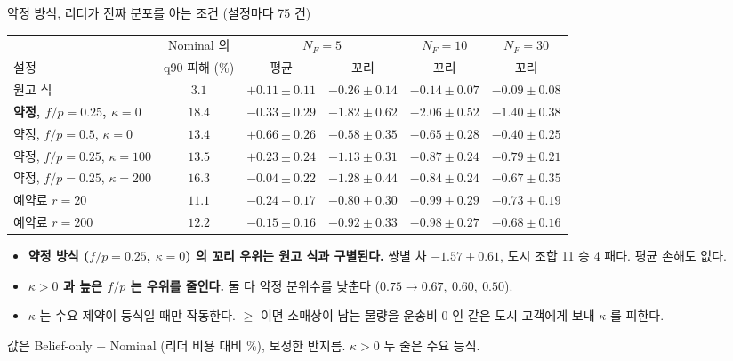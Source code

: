 \documentclass[aspectratio=169,11pt]{beamer}
\begin{document}
\begin{frame}{약정 방식, 리더가 진짜 분포를 아는 조건 (설정마다 75 건)}
\begin{center}
\scriptsize
\begin{tabular}{lccccc}
\toprule
 & Nominal 의 & \multicolumn{2}{c}{$N_F = 5$} & $N_F = 10$ & $N_F = 30$\\
\cmidrule(lr){3-4}\cmidrule(lr){5-5}\cmidrule(lr){6-6}
설정 & q90 피해 (\%) & 평균 & 꼬리 & 꼬리 & 꼬리\\
\midrule
원고 식 & $3.1$ & $+0.11 \pm 0.11$ & $-0.26 \pm 0.14$ & $-0.14 \pm 0.07$ & $-0.09 \pm 0.08$\\
\midrule
\textbf{약정, $f/p = 0.25$, $\kappa = 0$} & $18.4$ & $-0.33 \pm 0.29$ & $\mathbf{-1.82 \pm 0.62}$ & $-2.06 \pm 0.52$ & $-1.40 \pm 0.38$\\
약정, $f/p = 0.5$, $\kappa = 0$ & $13.4$ & $+0.66 \pm 0.26$ & $-0.58 \pm 0.35$ & $-0.65 \pm 0.28$ & $-0.40 \pm 0.25$\\
약정, $f/p = 0.25$, $\kappa = 100$ & $13.5$ & $+0.23 \pm 0.24$ & $-1.13 \pm 0.31$ & $-0.87 \pm 0.24$ & $-0.79 \pm 0.21$\\
약정, $f/p = 0.25$, $\kappa = 200$ & $16.3$ & $-0.04 \pm 0.22$ & $-1.28 \pm 0.44$ & $-0.84 \pm 0.24$ & $-0.67 \pm 0.35$\\
\midrule
예약료 $r = 20$ & $11.1$ & $-0.24 \pm 0.17$ & $-0.80 \pm 0.30$ & $-0.99 \pm 0.29$ & $-0.73 \pm 0.19$\\
예약료 $r = 200$ & $12.2$ & $-0.15 \pm 0.16$ & $-0.92 \pm 0.33$ & $-0.98 \pm 0.27$ & $-0.68 \pm 0.16$\\
\bottomrule
\end{tabular}
\end{center}
\vspace{-0.4em}
{\small
\begin{itemize}
  \item \textbf{약정 방식 ($f/p = 0.25$, $\kappa = 0$) 의 꼬리 우위는 원고 식과 구별된다.} 쌍별 차 $-1.57 \pm 0.61$, 도시 조합 11 승 4 패다. 평균 손해도 없다.
  \item \textbf{$\kappa > 0$ 과 높은 $f/p$ 는 우위를 줄인다.} 둘 다 약정 분위수를 낮춘다 ($0.75 \to 0.67,\ 0.60,\ 0.50$).
  \item $\kappa$ 는 수요 제약이 등식일 때만 작동한다. $\ge$ 이면 소매상이 남는 물량을 운송비 $0$ 인 같은 도시 고객에게 보내 $\kappa$ 를 피한다.
\end{itemize}}
{\scriptsize 값은 Belief-only $-$ Nominal (리더 비용 대비 \%), 보정한 반지름. $\kappa > 0$ 두 줄은 수요 등식.}
\end{frame}
\end{document}
